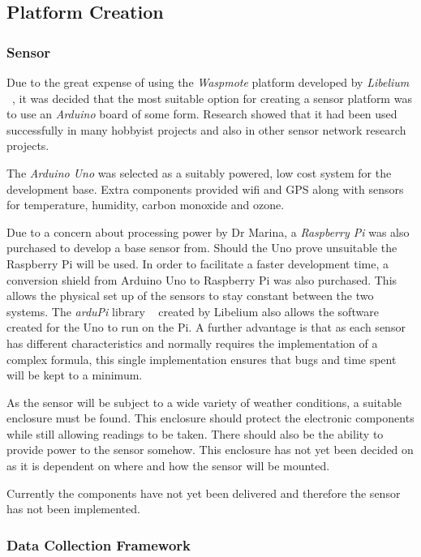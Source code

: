 \subsection{Platform Creation}\label{platformcreation}

\subsubsection{Sensor}\label{sensor}

Due to the great expense of using the \emph{Waspmote} platform developed by \emph{Libelium} ~\cite{waspmote}, it was decided that the most suitable option for creating a sensor platform was to use an \emph{Arduino} board of some form. Research showed that it had been used successfully in many hobbyist projects and also in other sensor network research projects. ~\cite{arduinoproj1}~\cite{arduinoproj2}~\cite{arduinoproj3} 

The \emph{Arduino Uno} was selected as a suitably powered, low cost system for the development base. Extra components provided wifi and GPS along with sensors for temperature, humidity, carbon monoxide and ozone. 

Due to a concern about processing power by Dr Marina, a \emph{Raspberry Pi} was also purchased to develop a base sensor from. Should the Uno prove unsuitable the Raspberry Pi will be used. In order to facilitate a faster development time, a conversion shield from Arduino Uno to Raspberry Pi was also purchased. This allows the physical set up of the sensors to stay constant between the two systems. The \emph{arduPi} library ~\cite{ardupi} created by Libelium also allows the software created for the Uno to run on the Pi. A further advantage is that as each sensor has different characteristics and normally requires the implementation of a complex formula, this single implementation ensures that bugs and time spent will be kept to a minimum. 

As the sensor will be subject to a wide variety of weather conditions, a suitable enclosure must be found. This enclosure should protect the electronic components while still allowing readings to be taken. There should also be the ability to provide power to the sensor somehow. This enclosure has not yet been decided on as it is dependent on where and how the sensor will be mounted. 

Currently the components have not yet been delivered and therefore the sensor has not been implemented. 

\subsubsection{Data Collection Framework}\label{datacollectionframework}

